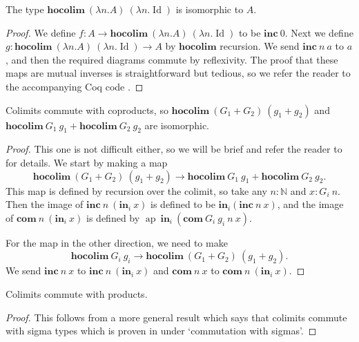 \documentclass[a4paper,UKenglish]{lipics-v2016}
\newcommand{\Boperator}[1]{\mathrm{\mathbf{#1}}}
\newcommand{\inn}{\Boperator{in}}
\newcommand{\ap}[0]{\operatorname{ap}}
\newcommand{\hocolim}[0]{\Boperator{hocolim}}
\newcommand{\inc}[0]{\Boperator{inc}}
\newcommand{\com}[0]{\Boperator{com}}
\begin{document}
\begin{lemma}
\label{lem:colimcon}
The type $\hocolim \> (\lambda n . A) \> (\lambda n . \operatorname{Id})$ is isomorphic to $A$.
\end{lemma}

\begin{proof}
We define $f : A \rightarrow \hocolim \> (\lambda n . A) \> (\lambda n . \operatorname{Id})$ to be $\inc \> 0$.
Next we define $g : \hocolim \> (\lambda n . A) \> (\lambda n . \operatorname{Id}) \rightarrow A$ by $\hocolim$ recursion.
We send $\inc \> n \> a$ to $a$, and then the required diagrams commute by reflexivity.
The proof that these maps are mutual inverses is straightforward but tedious, so we refer the reader to the accompanying Coq code \cite{CoqImpl}.
\end{proof}

\begin{lemma}
\label{lem:colimsum}
Colimits commute with coproducts, so $\hocolim \> (G_1 + G_2) \> (g_1 + g_2)$ and $\hocolim \> G_1 \> g_1 + \hocolim \> G_2 \> g_2$ are isomorphic.
\end{lemma}

\begin{proof}
This one is not difficult either, so we will be brief and refer the reader to \cite{CoqImpl} for details.
We start by making a map 
\[
\hocolim \> (G_1+G_2) \> (g_1 + g_2) \rightarrow \hocolim \> G_1 \> g_1 + \hocolim \> G_2 \> g_2.
\]
This map is defined by recursion over the colimit, so take any $n : \mathbb{N}$ and $x : G_i \> n$.
Then the image of $\inc \> n \> (\inn_i \> x)$ is defined to be $\inn_i (\inc \> n \> x)$, and the image of $\com \> n \> (\inn_i \> x)$ is defined by
$\ap \> \inn_i \> (\com \> G_i \> g_i \> n \> x)$.

For the map in the other direction, we need to make 
\[
\hocolim \> G_i \> g_i \rightarrow \hocolim \> (G_1 + G_2) \> (g_1 + g_2).
\]
We send $\inc \> n \> x$ to $\inc \> n \> (\inn_i \> x)$ and $\com \> n \> x$ to $\com \> n \> (\inn_i \> x)$.
\end{proof}

\begin{lemma}
\label{lem:colimprod}
Colimits commute with products.
\end{lemma}

\begin{proof}
This follows from a more general result which says that colimits commute with sigma types which is proven in \cite{boulier2015colimites,boulier2016} under `commutation with sigmas'.
\end{proof}
\end{document}
